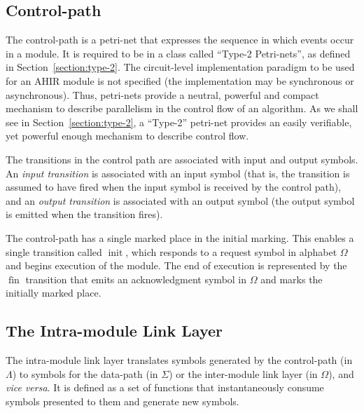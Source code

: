 \documentclass[conference]{IEEEtran}
\newcommand{\sym}[1]{$\operatorname{#1}$}
\begin{document}
\subsection{Control-path}


The control-path is a petri-net that expresses the sequence in which
events occur in a module. It is required to be in a class called
``Type-2 Petri-nets'', as defined in Section~\ref{section:type-2}.
The circuit-level implementation paradigm to be used for an AHIR module is
not specified (the implementation may be synchronous or asynchronous).
Thus, petri-nets provide a neutral, powerful and compact mechanism to 
describe parallelism in the control flow of an algorithm.  
As we shall see in Section~\ref{section:type-2}, a ``Type-2'' petri-net
provides an easily verifiable, yet powerful enough mechanism to
describe control flow.

The transitions in the control path are associated with input and
output symbols.  An {\em input transition} is associated with
an input symbol (that is, the transition is assumed to have fired
when the input symbol is received by the control path), and an {\em output transition}
is associated with an output symbol (the output symbol is emitted
when the transition fires).

The control-path has a single marked place in the initial marking.
This enables a single transition called \sym{init}, which responds to
a request symbol in alphabet $\Omega$ and begins execution of the
module. The end of execution is represented by the \sym{fin}
transition that emits an acknowledgment symbol in $\Omega$ and marks
the initially marked place.

\subsection{The Intra-module Link Layer}

The intra-module link layer translates symbols generated by the
control-path (in $\Lambda$) to symbols for the data-path (in $\Sigma$)
or the inter-module link layer (in $\Omega$), and \emph{vice versa}.
It is defined as a set of functions that instantaneously consume
symbols presented to them and generate new symbols.
\end{document}

